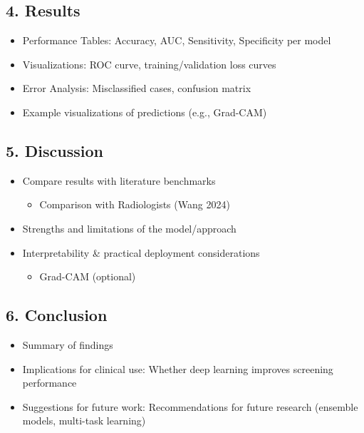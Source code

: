 \documentclass[
  12pt,
  letterpaper,
  DIV=11,
  numbers=noendperiod]{scrartcl}
\providecommand{\tightlist}{%
  \setlength{\itemsep}{0pt}\setlength{\parskip}{0pt}}
\begin{document}
\subsection{4. Results}\label{results}

\begin{itemize}
\tightlist
\item
  Performance Tables: Accuracy, AUC, Sensitivity, Specificity per model
\item
  Visualizations: ROC curve, training/validation loss curves
\item
  Error Analysis: Misclassified cases, confusion matrix
\item
  Example visualizations of predictions (e.g., Grad-CAM)
\end{itemize}

\subsection{5. Discussion}\label{discussion}

\begin{itemize}
\tightlist
\item
  Compare results with literature benchmarks

  \begin{itemize}
  \tightlist
  \item
    Comparison with Radiologists (Wang 2024)
  \end{itemize}
\item
  Strengths and limitations of the model/approach
\item
  Interpretability \& practical deployment considerations

  \begin{itemize}
  \tightlist
  \item
    Grad-CAM (optional)
  \end{itemize}
\end{itemize}

\subsection{6. Conclusion}\label{conclusion}

\begin{itemize}
\tightlist
\item
  Summary of findings
\item
  Implications for clinical use: Whether deep learning improves
  screening performance
\item
  Suggestions for future work: Recommendations for future research
  (ensemble models, multi-task learning)
\end{itemize}
\end{document}
